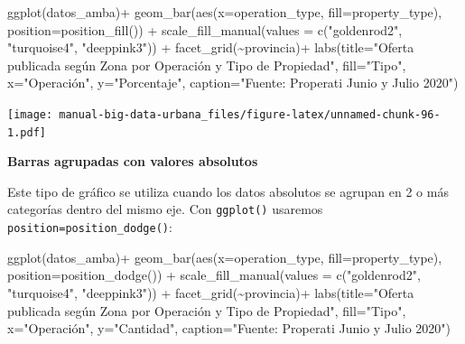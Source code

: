 \documentclass[
  spanish,
]{book}
\newenvironment{Shaded}{\begin{snugshade}}{\end{snugshade}}
\newcommand{\AttributeTok}[1]{\textcolor[rgb]{0.77,0.63,0.00}{#1}}
\newcommand{\FunctionTok}[1]{\textcolor[rgb]{0.00,0.00,0.00}{#1}}
\newcommand{\NormalTok}[1]{#1}
\newcommand{\SpecialCharTok}[1]{\textcolor[rgb]{0.00,0.00,0.00}{#1}}
\newcommand{\StringTok}[1]{\textcolor[rgb]{0.31,0.60,0.02}{#1}}
\begin{document}
\begin{Shaded}
\begin{Highlighting}[]
\FunctionTok{ggplot}\NormalTok{(datos\_amba)}\SpecialCharTok{+}
  \FunctionTok{geom\_bar}\NormalTok{(}\FunctionTok{aes}\NormalTok{(}\AttributeTok{x=}\NormalTok{operation\_type, }\AttributeTok{fill=}\NormalTok{property\_type), }\AttributeTok{position=}\FunctionTok{position\_fill}\NormalTok{()) }\SpecialCharTok{+}
  \FunctionTok{scale\_fill\_manual}\NormalTok{(}\AttributeTok{values =} \FunctionTok{c}\NormalTok{(}\StringTok{"goldenrod2"}\NormalTok{, }\StringTok{"turquoise4"}\NormalTok{, }\StringTok{"deeppink3"}\NormalTok{)) }\SpecialCharTok{+}
  \FunctionTok{facet\_grid}\NormalTok{(}\SpecialCharTok{\textasciitilde{}}\NormalTok{provincia)}\SpecialCharTok{+}
  \FunctionTok{labs}\NormalTok{(}\AttributeTok{title=}\StringTok{"Oferta publicada según Zona por Operación y Tipo de Propiedad"}\NormalTok{,}
       \AttributeTok{fill=}\StringTok{"Tipo"}\NormalTok{,}
       \AttributeTok{x=}\StringTok{"Operación"}\NormalTok{,}
       \AttributeTok{y=}\StringTok{"Porcentaje"}\NormalTok{,}
       \AttributeTok{caption=}\StringTok{"Fuente: Properati Junio y Julio 2020"}\NormalTok{)}
\end{Highlighting}
\end{Shaded}

\texttt{[image: manual-big-data-urbana\_files/figure-latex/unnamed-chunk-96-1.pdf]}

\textbf{Barras agrupadas con valores absolutos}

Este tipo de gráfico se utiliza cuando los datos absolutos se agrupan en 2 o más categorías dentro del mismo eje. Con \texttt{ggplot()} usaremos \texttt{position=position\_dodge()}:

\begin{Shaded}
\begin{Highlighting}[]
\FunctionTok{ggplot}\NormalTok{(datos\_amba)}\SpecialCharTok{+}
  \FunctionTok{geom\_bar}\NormalTok{(}\FunctionTok{aes}\NormalTok{(}\AttributeTok{x=}\NormalTok{operation\_type, }\AttributeTok{fill=}\NormalTok{property\_type), }\AttributeTok{position=}\FunctionTok{position\_dodge}\NormalTok{()) }\SpecialCharTok{+}
  \FunctionTok{scale\_fill\_manual}\NormalTok{(}\AttributeTok{values =} \FunctionTok{c}\NormalTok{(}\StringTok{"goldenrod2"}\NormalTok{, }\StringTok{"turquoise4"}\NormalTok{, }\StringTok{"deeppink3"}\NormalTok{)) }\SpecialCharTok{+}
  \FunctionTok{facet\_grid}\NormalTok{(}\SpecialCharTok{\textasciitilde{}}\NormalTok{provincia)}\SpecialCharTok{+}
  \FunctionTok{labs}\NormalTok{(}\AttributeTok{title=}\StringTok{"Oferta publicada según Zona por Operación y Tipo de Propiedad"}\NormalTok{,}
       \AttributeTok{fill=}\StringTok{"Tipo"}\NormalTok{,}
       \AttributeTok{x=}\StringTok{"Operación"}\NormalTok{,}
       \AttributeTok{y=}\StringTok{"Cantidad"}\NormalTok{,}
       \AttributeTok{caption=}\StringTok{"Fuente: Properati Junio y Julio 2020"}\NormalTok{)}
\end{Highlighting}
\end{Shaded}
\end{document}
